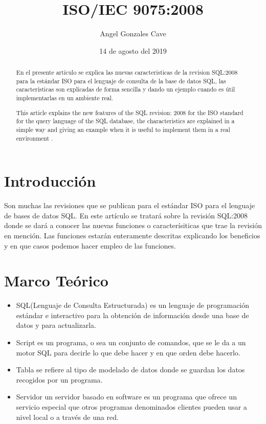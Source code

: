 \documentclass{article}
\begin{document}
\title{ISO/IEC 9075:2008}
\author{Angel Gonzales Cave}
\date {14 de agosto del 2019}
\maketitle

\begin{abstract}
En el presente artículo se explica las nuevas caracteristicas de la revision SQL:2008 para la estándar ISO para el lenguaje de consulta de la base de datos SQL, las características son  explicadas de forma sencilla y dando un ejemplo cuando es útil implementarlas en un ambiente real.
\end{abstract}
\begin{abstract}
This article explains the new features of the SQL revision: 2008 for the ISO standard for the query language of the SQL database, the characteristics are explained in a simple way and giving an example when it is useful to implement them in a real environment .
\end{abstract}
\section{Introducción}
Son muchas las revisiones que se publican para el estándar ISO para el lenguaje de bases de datos SQL. En este artículo se tratará sobre la revisión SQL:2008 donde se dará a conocer las nuevas funciones o caracterísiticas que trae la revisión en mención. Las funciones estarán enteramente descritas explicando los beneficios y en que casos podemos hacer empleo de las funciones.
\section{Marco Teórico}
\begin{itemize}
\item SQL(Lenguaje de Consulta Estructurada) es un lenguaje de programación estándar e interactivo para la obtención de información desde una base de datos y para actualizarla.
\item Script es un programa, o sea un conjunto de comandos, que se le da a un motor SQL para decirle lo que debe hacer y en que orden debe hacerlo.
\item Tabla se refiere al tipo de modelado de datos donde se guardan los datos recogidos por un programa.
\item Servidor un servidor basado en software es un programa que ofrece un servicio especial que otros programas denominados clientes pueden usar a nivel local o a través de una red.
\end{itemize}
\end{document}
